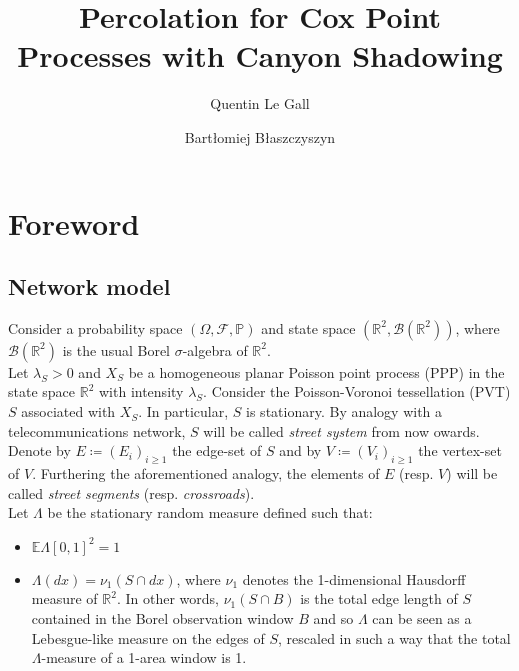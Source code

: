 \documentclass[11pt,a4paper]{amsart}
\theoremstyle{exampstyle}
\theoremstyle{exampnotations}
\begin{document}
\title{Percolation for Cox Point Processes with Canyon Shadowing}
\author{Quentin Le Gall}
\address{Orange Labs Networks, 44 avenue de la République 92320 Ch\^atillon}
\author{Bart\l{}omiej B\l{}aszczyszyn}
\address{Inria - \MakeUppercase{ens}, 2 rue Simone Iff CS42112 75589 Paris Cedex 12}
\maketitle
\tableofcontents
\section{Foreword}
\subsection{Network model}
\label{Ss.NetworkModel}
Consider a probability space $(\Omega, \mathcal{F}, \mathbb{P})$ and state space $(\mathbb{R}^{2}, \mathcal{B}(\mathbb{R}^{2}))$, where $\mathcal{B}(\mathbb{R}^{2})$ is the usual Borel $\sigma$-algebra of $\mathbb{R}^{2}$. \\

Let $\lambda_{S} > 0$ and $X_{S}$ be a homogeneous planar Poisson point process (PPP) in the state space $\mathbb{R}^{2}$ with intensity $\lambda_S$. Consider the Poisson-Voronoi tessellation (PVT) $S$ associated with $X_S$. In particular, $S$ is stationary. By analogy with a telecommunications network, $S$ will be called \emph{street system} from now owards. \\
\indent Denote by $E \coloneqq (E_{i})_{i \geq 1}$ the edge-set of $S$ and by $V \coloneqq (V_{i})_{i \geq 1}$ the vertex-set of $V$. Furthering the aforementioned analogy, the elements of $E$ (resp. $V$) will be called \emph{street segments} (resp. \emph{crossroads}). \\
\indent Let $\Lambda$ be the stationary random measure defined such that:
\begin{itemize}
\item $\mathbb{E} \Lambda \left[0,1\right]^{2} = 1$
\item $\Lambda(dx) = \nu_{1}(S \cap dx)$, where $\nu_{1}$ denotes the 1-dimensional Hausdorff measure of $\mathbb{R}^{2}$. In other words, $\nu_{1}(S \cap B)$ is the total edge length of $S$ contained in the Borel observation window $B$ and so $\Lambda$ can be seen as a Lebesgue-like measure on the edges of $S$, rescaled in such a way that the total $\Lambda$-measure of a 1-area window is 1. \\
\end{itemize}
\end{document}
